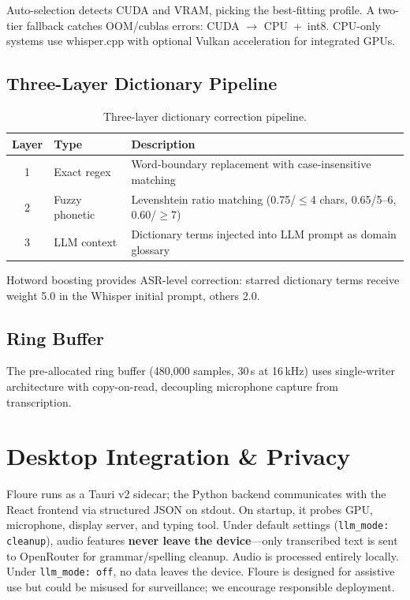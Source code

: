 \documentclass[11pt]{article}
\begin{document}
Auto-selection detects CUDA and VRAM, picking the best-fitting profile. A two-tier
fallback catches OOM/cublas errors: CUDA $\to$ CPU~+~int8. CPU-only systems use
whisper.cpp with optional Vulkan acceleration for integrated GPUs.

\subsection{Three-Layer Dictionary Pipeline}

\begin{table}[t]
\centering
\small
\begin{tabular}{@{}clp{5cm}@{}}
\toprule
\textbf{Layer} & \textbf{Type} & \textbf{Description} \\
\midrule
1 & Exact regex & Word-boundary replacement with case-insensitive matching \\
2 & Fuzzy phonetic & Levenshtein ratio matching (0.75/$\leq$4 chars, 0.65/5--6, 0.60/$\geq$7) \\
3 & LLM context & Dictionary terms injected into LLM prompt as domain glossary \\
\bottomrule
\end{tabular}
\caption{Three-layer dictionary correction pipeline.}
\label{tab:dict}
\end{table}

Hotword boosting provides ASR-level correction: starred dictionary terms receive weight
5.0 in the Whisper initial prompt, others 2.0.

\subsection{Ring Buffer}

The pre-allocated ring buffer (480,000 samples, 30\,s at 16\,kHz) uses single-writer
architecture with copy-on-read, decoupling microphone capture from transcription.

\section{Desktop Integration \& Privacy}

Floure runs as a Tauri v2 sidecar; the Python backend communicates with the React
frontend via structured JSON on stdout. On startup, it probes GPU, microphone, display
server, and typing tool. Under default settings (\texttt{llm\_mode: cleanup}), audio
features \textbf{never leave the device}---only transcribed text is sent to OpenRouter
for grammar/spelling cleanup. Audio is processed entirely locally. Under
\texttt{llm\_mode: off}, no data leaves the device. Floure is designed for assistive
use but could be misused for surveillance; we encourage responsible deployment.
\end{document}
